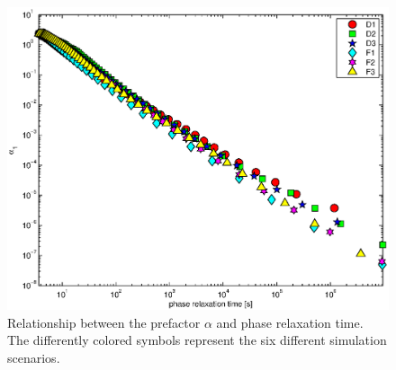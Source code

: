 \documentclass{article}
\begin{document}
\begin{figure}\centering
\includegraphics[width=\textwidth]{Figures/tphase_alpha}
\caption{Relationship between the prefactor $\alpha$ and phase relaxation time. The differently
colored symbols represent the six different simulation scenarios.}
\end{figure}
\end{document}
